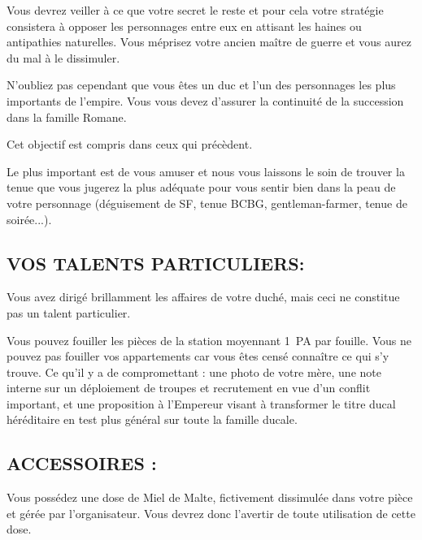 \documentclass[14pt,twocolumn]{extarticle}
\begin{document}
Vous devrez veiller à ce que votre secret le reste et pour cela votre stratégie
consistera à opposer les personnages entre eux en attisant les haines ou
antipathies naturelles. Vous méprisez votre ancien maître de guerre et vous
aurez du mal à le dissimuler.

N'oubliez pas cependant que vous êtes un duc et l'un des personnages les plus
importants de l'empire. Vous vous devez d'assurer la continuité de la
succession dans la famille Romane.

Cet objectif est compris dans ceux qui précèdent.

Le plus important est de vous amuser et nous vous laissons le soin de trouver
la tenue que vous jugerez la plus adéquate pour vous sentir bien dans la peau
de votre personnage (déguisement de SF, tenue BCBG, gentleman-farmer, tenue de
soirée...).

\subsection{VOS TALENTS PARTICULIERS:}

Vous avez dirigé brillamment les affaires de votre duché, mais ceci ne
constitue pas un talent particulier.

Vous pouvez fouiller les pièces de la station moyennant 1~PA par fouille. Vous
ne pouvez pas fouiller vos appartements car vous êtes censé connaître ce qui
s'y trouve. Ce qu'il y a de compromettant : une photo de votre mère, une note
interne sur un déploiement de troupes et recrutement en vue d’un conflit
important, et une proposition à l’Empereur visant à transformer le titre ducal
héréditaire en test plus général sur toute la famille ducale.

\subsection{ACCESSOIRES :}

Vous possédez une dose de Miel de Malte, fictivement dissimulée dans votre
pièce et gérée par l'organisateur. Vous devrez donc l'avertir de toute
utilisation de cette dose.
\end{document}
